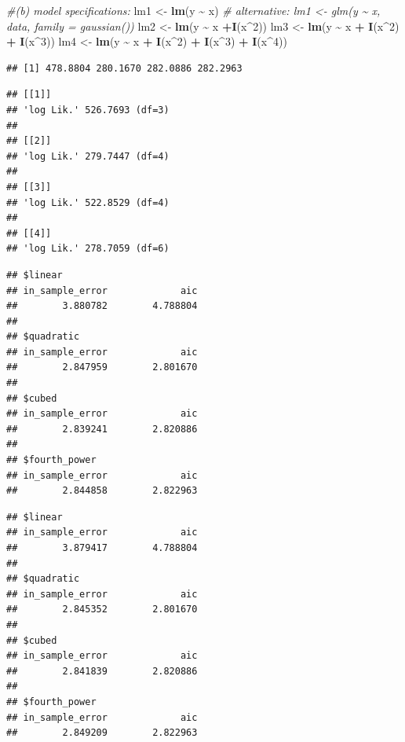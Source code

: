 \documentclass[
]{article}
\newenvironment{Shaded}{\begin{snugshade}}{\end{snugshade}}
\newcommand{\CommentTok}[1]{\textcolor[rgb]{0.56,0.35,0.01}{\textit{#1}}}
\newcommand{\DecValTok}[1]{\textcolor[rgb]{0.00,0.00,0.81}{#1}}
\newcommand{\FunctionTok}[1]{\textcolor[rgb]{0.13,0.29,0.53}{\textbf{#1}}}
\newcommand{\NormalTok}[1]{#1}
\newcommand{\OtherTok}[1]{\textcolor[rgb]{0.56,0.35,0.01}{#1}}
\newcommand{\SpecialCharTok}[1]{\textcolor[rgb]{0.81,0.36,0.00}{\textbf{#1}}}
\begin{document}
\begin{Shaded}
\begin{Highlighting}[]
\CommentTok{\#(b) model specifications:}
\NormalTok{lm1 }\OtherTok{\textless{}{-}} \FunctionTok{lm}\NormalTok{(y }\SpecialCharTok{\textasciitilde{}}\NormalTok{ x) }\CommentTok{\# alternative: lm1 \textless{}{-} glm(y \textasciitilde{} x, data, family = gaussian()) }
\NormalTok{lm2 }\OtherTok{\textless{}{-}} \FunctionTok{lm}\NormalTok{(y }\SpecialCharTok{\textasciitilde{}}\NormalTok{ x }\SpecialCharTok{+}\FunctionTok{I}\NormalTok{(x}\SpecialCharTok{\^{}}\DecValTok{2}\NormalTok{))}
\NormalTok{lm3 }\OtherTok{\textless{}{-}} \FunctionTok{lm}\NormalTok{(y }\SpecialCharTok{\textasciitilde{}}\NormalTok{ x }\SpecialCharTok{+} \FunctionTok{I}\NormalTok{(x}\SpecialCharTok{\^{}}\DecValTok{2}\NormalTok{) }\SpecialCharTok{+} \FunctionTok{I}\NormalTok{(x}\SpecialCharTok{\^{}}\DecValTok{3}\NormalTok{))}
\NormalTok{lm4 }\OtherTok{\textless{}{-}} \FunctionTok{lm}\NormalTok{(y }\SpecialCharTok{\textasciitilde{}}\NormalTok{ x }\SpecialCharTok{+} \FunctionTok{I}\NormalTok{(x}\SpecialCharTok{\^{}}\DecValTok{2}\NormalTok{) }\SpecialCharTok{+} \FunctionTok{I}\NormalTok{(x}\SpecialCharTok{\^{}}\DecValTok{3}\NormalTok{) }\SpecialCharTok{+} \FunctionTok{I}\NormalTok{(x}\SpecialCharTok{\^{}}\DecValTok{4}\NormalTok{))}
\end{Highlighting}
\end{Shaded}

\begin{verbatim}
## [1] 478.8804 280.1670 282.0886 282.2963
\end{verbatim}

\begin{verbatim}
## [[1]]
## 'log Lik.' 526.7693 (df=3)
## 
## [[2]]
## 'log Lik.' 279.7447 (df=4)
## 
## [[3]]
## 'log Lik.' 522.8529 (df=4)
## 
## [[4]]
## 'log Lik.' 278.7059 (df=6)
\end{verbatim}

\begin{verbatim}
## $linear
## in_sample_error             aic 
##        3.880782        4.788804 
## 
## $quadratic
## in_sample_error             aic 
##        2.847959        2.801670 
## 
## $cubed
## in_sample_error             aic 
##        2.839241        2.820886 
## 
## $fourth_power
## in_sample_error             aic 
##        2.844858        2.822963
\end{verbatim}

\begin{verbatim}
## $linear
## in_sample_error             aic 
##        3.879417        4.788804 
## 
## $quadratic
## in_sample_error             aic 
##        2.845352        2.801670 
## 
## $cubed
## in_sample_error             aic 
##        2.841839        2.820886 
## 
## $fourth_power
## in_sample_error             aic 
##        2.849209        2.822963
\end{verbatim}
\end{document}
